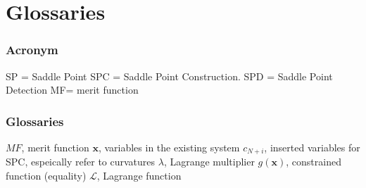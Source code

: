 \chapter{Glossaries} %
\label{glossaries} %
\captionsetup[figure]{labelfont=bf}
\captionsetup{margin=1.5em}
\captionsetup[table]{labelfont=bf}



\subsection{Acronym}

SP = Saddle Point
SPC = Saddle Point Construction.
SPD = Saddle Point Detection
MF= merit function 

\subsection{Glossaries}
$MF$, merit function
$\textbf{x}$, variables in the existing system
$c_{N+i}$, inserted variables for SPC, espeically refer to curvatures
$\lambda$, Lagrange multiplier
$g(\textbf{x})$, constrained function (equality)
$\mathcal{L}$, Lagrange function










